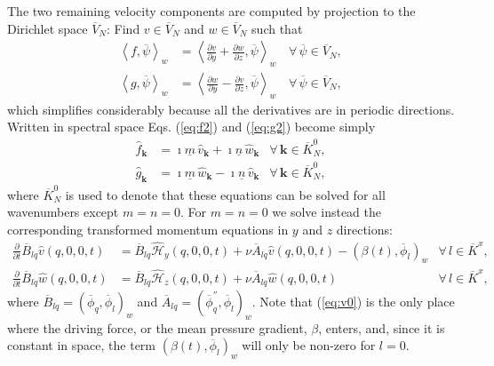\documentclass[preprint]{elsarticle}
\newcommand{\D}[1]{\overline{#1}}
\begin{document}
The two remaining velocity components are computed by projection to the 
Dirichlet space $\D{V}_N$: Find 
${v} \in \D{V}_N$ and $w \in \D{V}_N$ such that
\begin{align}
\left<f, \D{\psi}\right>_w &= \left<\frac{\partial v}{\partial y} + 
\frac{\partial w}{\partial z}, \D{\psi}\right>_w \, &\forall \, \D{\psi} \in 
\D{V}_N, \label{eq:f2} \\
\left<g, \D{\psi}\right>_w &= \left<\frac{\partial w}{\partial y}  - 
\frac{\partial v}{\partial z}, \D{\psi}\right>_w \, &\forall \, \D{\psi} \in 
\D{V}_N, \label{eq:g2}
\end{align}
which simplifies considerably because all the derivatives are in periodic 
directions. Written in spectral space Eqs. (\ref{eq:f2}) and (\ref{eq:g2}) 
become simply
\begin{align}
\hat{f}_{\bm{k}} &= \imath \underline{m}\, \hat{v}_{\bm{k}} + \imath 
\underline{n}\, \hat{w}_{\bm{k}} &\forall \, \bm{k} \in \D{K}_N^0, \label{eq:f3} \\
\hat{g}_{\bm{k}} &= \imath \underline{m}\, \hat{w}_{\bm{k}} - \imath 
\underline{n}\, \hat{v}_{\bm{k}} & \forall \, \bm{k} \in \D{K}_N^0, \label{eq:g3}
\end{align}
where $\D{K}_N^0$ is used to denote that these equations can be solved for all 
wavenumbers except $m=n=0$. For $m=n=0$ we solve instead the 
corresponding transformed momentum equations in $y$ and $z$ directions:
\begin{align}
\frac{\partial }{\partial t} \D{B}_{lq}\hat{v}(q, 0, 0, t) &= 
\D{B}_{lq}\hat{\mathcal{H}}_y(q, 0, 0, t) + \nu \D{A}_{lq} \hat{v}(q, 0, 0, t) - \left(\beta(t), \D{\phi}_l \right)_w
& \forall\, l \in \D{K}^x, \label{eq:v0}\\
\frac{\partial }{\partial t} \D{B}_{lq}\hat{w}(q, 0, 0, t) &= 
\D{B}_{lq}\hat{\mathcal{H}}_z(q, 0, 0, t) + \nu \D{A}_{lq} \hat{w}(q, 0, 0, t) 
& \forall\, l \in \D{K}^x,\label{eq:w0}
\end{align}
where $\D{B}_{lq} = \left(\D{\phi}_q, \D{\phi}_l \right)_w$ and $\D{A}_{lq}=\left(\D{\phi}_q^{''}, \D{\phi}_l \right)_w$. Note that (\ref{eq:v0}) is the only place where the driving force, or the mean pressure gradient, $\beta$, enters, and, since it is constant in space, the term $\left(\beta(t), \D{\phi}_l \right)_w$ will only be non-zero for $l=0$.
\end{document}
